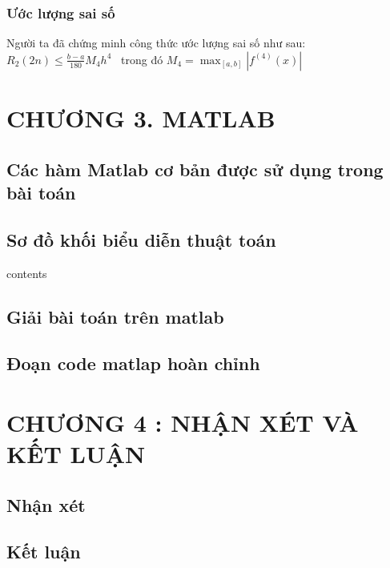 \documentclass[14pt,a4paper]{article}
\begin{document}
 \subsubsection*{Ước lượng sai số }
 Người ta đã chứng minh công thức ước lượng sai số như sau:\\
 \vspace{9pt} \hspace*{35pt}   ${\displaystyle R_2(2n) \leq \frac{b-a}{180}M_4 h^4}$ \, trong đó ${\displaystyle  M_4 = \max_{[a,b]}|f^{(4)}(x)|}$
\newpage
\section*{CHƯƠNG 3. MATLAB}
\subsection { Các hàm Matlab cơ bản được sử dụng trong bài toán}
\subsection{Sơ đồ khối biểu diễn thuật toán}
contents
\subsection{Giải bài toán trên matlab}
\subsection{Đoạn code matlap hoàn chỉnh}
\newpage
\section*{CHƯƠNG 4 : NHẬN XÉT VÀ KẾT LUẬN}
\subsection{  Nhận xét}
\subsection{Kết luận}
\newpage
\end{document}
